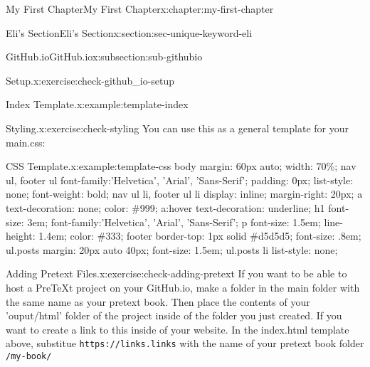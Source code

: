 \documentclass[oneside,10pt,]{book}
\newcommand{\mono}[1]{\texttt{#1}}
\numberwithin{equation}{section}
\begin{document}
\begin{chapterptx}{My First Chapter}{}{My First Chapter}{}{}{x:chapter:my-first-chapter}
\begin{sectionptx}{Eli's Section}{}{Eli's Section}{}{}{x:section:sec-unique-keyword-eli}
\begin{subsectionptx}{GitHub.io}{}{GitHub.io}{}{}{x:subsection:sub-githubio}
\begin{inlineexercise}{Setup.}{x:exercise:check-github_io-setup}
\begin{example}{Index Template.}{x:example:template-index}
\end{example}
%
%
\end{inlineexercise}
\begin{inlineexercise}{Styling.}{x:exercise:check-styling}%
You can use this as a general template for your main.css: \begin{example}{CSS Template.}{x:example:template-css}%
body \textbraceleft{} margin: 60px auto; width: 70\%; \textbraceright{} nav ul, footer ul \textbraceleft{} font-family:'Helvetica', 'Arial', 'Sans-Serif'; padding: 0px; list-style: none; font-weight: bold; \textbraceright{} nav ul li, footer ul li \textbraceleft{} display: inline; margin-right: 20px; \textbraceright{} a \textbraceleft{} text-decoration: none; color: \#999; \textbraceright{} a:hover \textbraceleft{} text-decoration: underline; \textbraceright{} h1 \textbraceleft{} font-size: 3em; font-family:'Helvetica', 'Arial', 'Sans-Serif'; \textbraceright{} p \textbraceleft{} font-size: 1.5em; line-height: 1.4em; color: \#333; \textbraceright{} footer \textbraceleft{} border-top: 1px solid \#d5d5d5; font-size: .8em; \textbraceright{} ul.posts \textbraceleft{} margin: 20px auto 40px; font-size: 1.5em; \textbraceright{} ul.posts li \textbraceleft{} list-style: none; \textbraceright{}%
\end{example}
%
\end{inlineexercise}
\begin{inlineexercise}{Adding Pretext Files.}{x:exercise:check-adding-pretext}%
If you want to be able to host a PreTeXt project on your GitHub.io, make a folder in the main folder with the same name as your pretext book. Then place the contents of your 'ouput\slash{}html' folder of the project inside of the folder you just created. If you want to create a link to this inside of your website. In the index.html template above, substitue \mono{https://links.links} with the name of your pretext book folder \mono{/my-book/}%
\end{inlineexercise}
\end{subsectionptx}
\begin{conclusion}{}%
\end{conclusion}%
\end{sectionptx}
\end{chapterptx}
\end{document}
